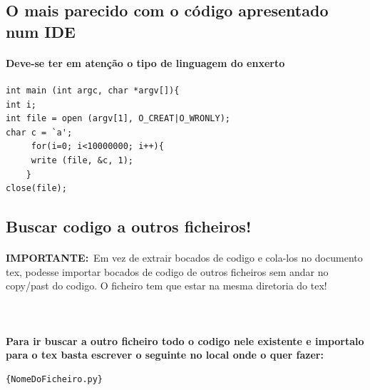 \documentclass[a4paper,11pt]{article}%
\begin{document}
\subsection{O mais parecido com o código apresentado num IDE}

\paragraph {Deve-se ter em atenção o tipo de linguagem do enxerto}
\begin{lstlisting}
int main (int argc, char *argv[]){
int i; 
int file = open (argv[1], O_CREAT|O_WRONLY);
char c = `a'; 
     for(i=0; i<10000000; i++){
     write (file, &c, 1); 
	}
close(file);
\end{lstlisting}



\newpage
\subsection{Buscar codigo a outros ficheiros!}

\paragraph{} \textbf{IMPORTANTE:}\ Em vez de extrair bocados de codigo e cola-los no documento tex, podesse importar bocados de codigo de outros ficheiros sem andar no copy/past do codigo. O ficheiro tem que estar na mesma diretoria do tex!
\paragraph{}

\paragraph{\ \ }\textbf{Para ir buscar a outro ficheiro todo o codigo nele existente e importalo para o tex basta escrever o seguinte no local onde o quer fazer:}
\begin{verbatim}
{NomeDoFicheiro.py}
\end{verbatim}
\end{document}
